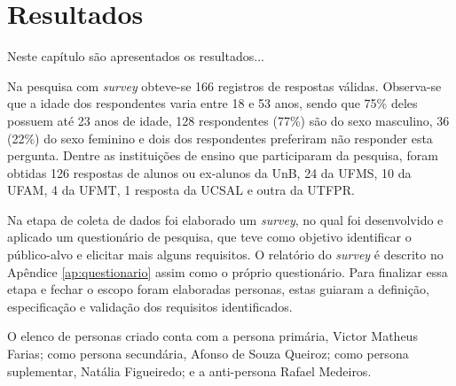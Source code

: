 \chapter{Resultados}
\label{chap:result}

Neste capítulo são apresentados os resultados...


Na pesquisa com \textit{survey} obteve-se 166 registros de respostas válidas. Observa-se que a idade dos respondentes varia entre 18 e 53 anos, sendo que 75\% deles possuem até 23 anos de idade, 128 respondentes (77\%) são do sexo masculino, 36 (22\%) do sexo feminino e dois dos respondentes preferiram não responder esta pergunta. Dentre as instituições de ensino que participaram da pesquisa, foram obtidas 126 respostas de alunos ou ex-alunos da UnB, 24 da UFMS, 10 da UFAM, 4 da UFMT, 1 resposta da UCSAL e outra da UTFPR.







Na etapa de coleta de dados foi elaborado um \textit{survey}, no qual foi desenvolvido e aplicado um questionário de pesquisa, que teve como objetivo identificar o público-alvo e elicitar mais alguns requisitos. O relatório do \textit{survey} é descrito no Apêndice \ref{ap:questionario} assim como o próprio questionário. Para finalizar essa etapa e fechar o escopo foram elaboradas personas, estas guiaram a definição, especificação e validação dos requisitos identificados.



O elenco de personas criado conta com a persona primária, Victor Matheus Farias; como persona secundária, Afonso de Souza Queiroz; como persona suplementar, Natália Figueiredo; e a anti-persona Rafael Medeiros.

\newpage








